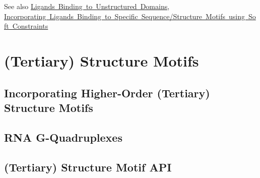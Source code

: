 \begin{DoxySeeAlso}{See also}
\mbox{\hyperlink{group__ligands__up}{Ligands Binding to Unstructured Domains}}, \mbox{\hyperlink{group__constraints__ligand}{Incorporating Ligands Binding to Specific Sequence/\+Structure Motifs using Soft Constraints}}
\end{DoxySeeAlso}
 \hypertarget{structure_motifs}{}\section{(Tertiary) Structure Motifs}\label{structure_motifs}
\hypertarget{structure_motifs_structure_motifs_intro}{}\subsection{Incorporating Higher-\/\+Order (\+Tertiary) Structure Motifs}\label{structure_motifs_structure_motifs_intro}
\hypertarget{structure_motifs_structure_motif_gquad}{}\subsection{R\+N\+A G-\/\+Quadruplexes}\label{structure_motifs_structure_motif_gquad}
\hypertarget{structure_motifs_structure_motif_api}{}\subsection{(\+Tertiary) Structure Motif A\+PI}\label{structure_motifs_structure_motif_api}
 